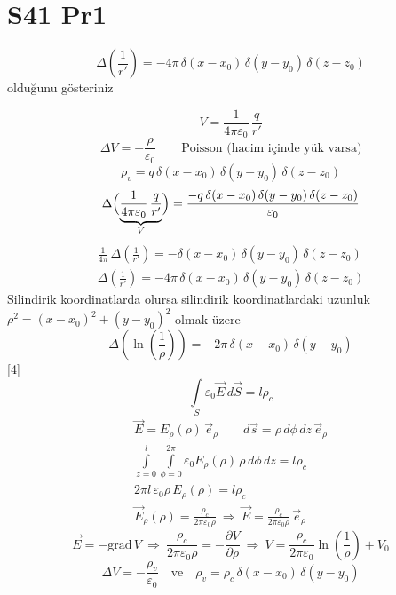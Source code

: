 \documentclass[11pt,a4paper]{article}
\begin{document}
\section{S41 Pr1}
\[ \Delta\left(\frac{1}{r'}\right)=-4\pi\,\delta(x-x_0)\,\delta(y-y_0)\,\delta(z-z_0) \]
olduğunu gösteriniz
\begin{center}
\end{center}
\[ V=\frac{1}{4\pi\varepsilon_0}\,\frac{q}{r'} \]
\[ \Delta V=-\frac{\rho}{\varepsilon_0}\qquad\text{Poisson (hacim içinde yük varsa)} \]
\[ \rho_v=q\,\delta(x-x_0)\,\delta(y-y_0)\,\delta(z-z_0) \]
\[ \Delta\Bigl(\underbrace{\frac{1}{4\pi\varepsilon_0}\,\frac{q}{r'}}_{V}\Bigr)=\frac{-q\,\delta(x-x_0)\,\delta(y-y_0)\,\delta(z-z_0)}{\varepsilon_0} \]
\begin{gather*}
\frac{1}{4\pi}\,\Delta\left(\frac{1}{r'}\right)=-\delta(x-x_0)\,\delta(y-y_0)\,\delta(z-z_0)\\
\Delta\left(\frac{1}{r'}\right)=-4\pi\,\delta(x-x_0)\,\delta(y-y_0)\,\delta(z-z_0)
\end{gather*}
Silindirik koordinatlarda olursa silindirik koordinatlardaki uzunluk $\rho^2=(x-x_0)^2+(y-y_0)^2$ olmak üzere
\[ \Delta\left(\ln\left(\frac{1}{\rho}\right)\right)=-2\pi\,\delta(x-x_0)\,\delta(y-y_0) \]
[4]
\[ \int\limits_S\varepsilon_0\vec E\,d\vec S=l\rho_c \]
\begin{gather*}
\vec E=E_\rho(\rho)\,\vec e_\rho\qquad d\vec s=\rho\,d\phi\,dz\,\vec e_\rho\\
\int\limits_{z=0}^{l}\int\limits_{\phi=0}^{2\pi}\varepsilon_0E_\rho(\rho)\,\rho\,d\phi\,dz=l\rho_c\\
2\pi l\,\varepsilon_0\rho\,E_\rho(\rho)=l\rho_c\\
\vec E_\rho(\rho)=\frac{\rho_c}{2\pi\varepsilon_0\rho}\ \Rightarrow\ \vec E=\frac{\rho_c}{2\pi\varepsilon_0\rho}\,\vec e_\rho
\end{gather*}
\[ \vec E=-\mathrm{grad}\,V\ \Rightarrow\ \frac{\rho_c}{2\pi\varepsilon_0\rho}=-\frac{\partial V}{\partial\rho}\ \Rightarrow\ V=\frac{\rho_c}{2\pi\varepsilon_0}\ln\left(\frac1\rho\right)+V_0 \]
\[ \Delta V=-\frac{\rho_v}{\varepsilon_0}\quad\text{ve}\quad\rho_v=\rho_c\,\delta(x-x_0)\,\delta(y-y_0) \]
\end{document}
